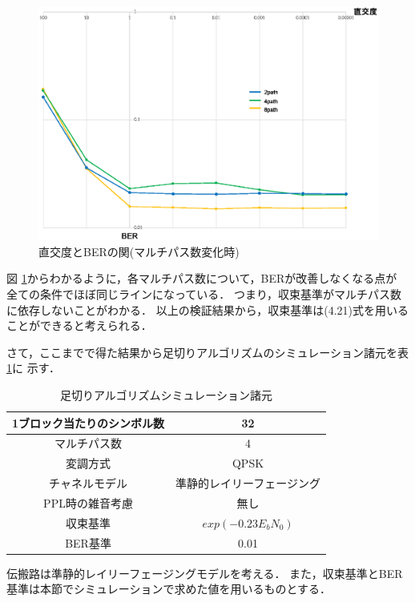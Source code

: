 \begin{figure}[h]
    \centering
    \includegraphics[width=0.95\linewidth]{chapter4/figure/CutoffSim2.eps}
    \caption{直交度とBERの関(マルチパス数変化時)}
    \label{figCutoffSim2}
\end{figure}

図 \ref{figCutoffSim2}からわかるように，各マルチパス数について，BERが改善しなくなる点が
全ての条件でほぼ同じラインになっている．
つまり，収束基準がマルチパス数に依存しないことがわかる．
以上の検証結果から，収束基準は(4.21)式を用いることができると考えられる．

さて，ここまでで得た結果から足切りアルゴリズムのシミュレーション諸元を表 \ref{tabCutoff3}に
示す．

\begin{table}[h]
    \begin{tabular}{|c|c|} \hline
        1ブロック当たりのシンボル数 & 32 \\ \hline
        マルチパス数 & 4 \\ \hline
        変調方式 & QPSK \\ \hline
        チャネルモデル & 準静的レイリーフェージング \\ \hline
        PPL時の雑音考慮 & 無し \\ \hline
        収束基準 & $exp(-0.23E_bN_0)$ \\ \hline
        BER基準 & 0.01 \\ \hline
    \end{tabular}
    \centering
    \caption{足切りアルゴリズムシミュレーション諸元}
    \label{tabCutoff3}
\end{table}

伝搬路は準静的レイリーフェージングモデルを考える．
また，収束基準とBER基準は本節でシミュレーションで求めた値を用いるものとする．

